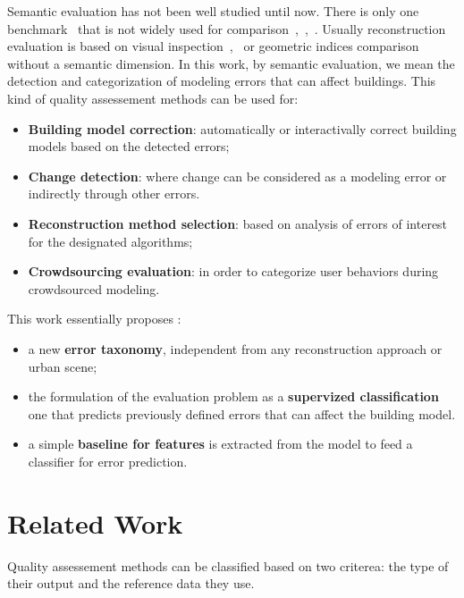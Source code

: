 \documentclass[runningheads]{llncs}
\begin{document}
	Semantic evaluation has not been well studied until now. There is only one benchmark~\cite{rottensteiner2014results} that is not widely used for comparison~\cite{Lafarge2012},~\cite{nguatem2017modeling},~\cite{li2016boxfitting}. Usually reconstruction evaluation is based on visual inspection~\cite{Durupt2006},~\cite{MacayMoreia2013} or geometric indices comparison~\cite{Kaartinen2005} without a semantic dimension. In this work, by semantic evaluation, we mean the detection and categorization of modeling errors that can affect buildings. This kind of quality assessement methods can be used for:
	\begin{itemize}
		\item \textbf{Building model correction}: automatically or interactivally correct building models based on the detected errors;
		\item \textbf{Change detection}: where change can be considered as a modeling error or indirectly through other errors.
		\item \textbf{Reconstruction method selection}: based on analysis of errors of interest for the designated algorithms;
		\item \textbf{Crowdsourcing evaluation}: in order to categorize user behaviors during crowdsourced modeling.
	\end{itemize}
	
	This work essentially proposes :
	\begin{itemize}
		\item a new \textbf{error taxonomy}, independent from any reconstruction approach or urban scene;
		\item the formulation of the evaluation problem as a \textbf{supervized classification} one that predicts previously defined errors that can affect the building model.
		\item a simple \textbf{baseline for features} is extracted from the model to feed a classifier for error prediction.
	\end{itemize}
\section{Related Work}

Quality assessement methods can be classified based on two criterea: the type of their output and the reference data they use.
\end{document}
